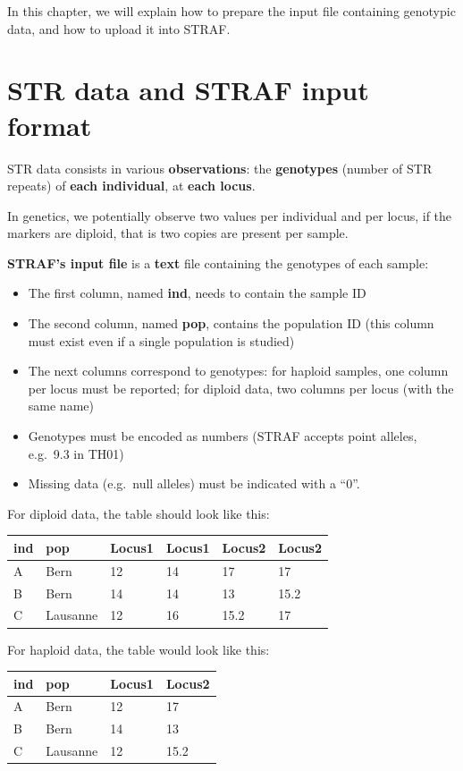 \documentclass[
]{book}
\begin{document}
In this chapter, we will explain how to prepare the input file containing
genotypic data, and how to upload it into STRAF.

\hypertarget{str-data-and-straf-input-format}{%
\section{STR data and STRAF input format}\label{str-data-and-straf-input-format}}

STR data consists in various \textbf{observations}: the \textbf{genotypes} (number of STR repeats)
of \textbf{each individual}, at \textbf{each locus}.

In genetics, we potentially observe two values per individual and per locus, if the
markers are diploid, that is two copies are present per sample.

\textbf{STRAF's input file} is a \textbf{text} file containing the genotypes of each sample:

\begin{itemize}
\item
  The first column, named \textbf{ind}, needs to contain the sample ID
\item
  The second column, named \textbf{pop}, contains the population ID (this column must exist even if a single population is studied)
\item
  The next columns correspond to genotypes: for haploid samples, one column per locus must be reported; for diploid data, two columns per locus (with the same name)
\item
  Genotypes must be encoded as numbers (STRAF accepts point alleles, e.g.~9.3 in TH01)
\item
  Missing data (e.g.~null alleles) must be indicated with a ``0''.
\end{itemize}

For diploid data, the table should look like this:

\begin{longtable}[]{@{}llllll@{}}
\toprule
ind & pop & Locus1 & Locus1 & Locus2 & Locus2\tabularnewline
\midrule
\endhead
A & Bern & 12 & 14 & 17 & 17\tabularnewline
B & Bern & 14 & 14 & 13 & 15.2\tabularnewline
C & Lausanne & 12 & 16 & 15.2 & 17\tabularnewline
\bottomrule
\end{longtable}

For haploid data, the table would look like this:

\begin{longtable}[]{@{}llll@{}}
\toprule
ind & pop & Locus1 & Locus2\tabularnewline
\midrule
\endhead
A & Bern & 12 & 17\tabularnewline
B & Bern & 14 & 13\tabularnewline
C & Lausanne & 12 & 15.2\tabularnewline
\bottomrule
\end{longtable}
\end{document}
